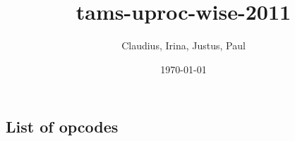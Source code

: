 \documentclass{article}
\author{Claudius, Irina, Justus, Paul}
\title{\cpu\\
tams-uproc-wise-2011}
\date{\today}
\begin{document}
\maketitle
\newpage

\tableofcontents
\newpage




\appendix
\section{\appendixname}

\subsection{List of opcodes}

\end{document}
